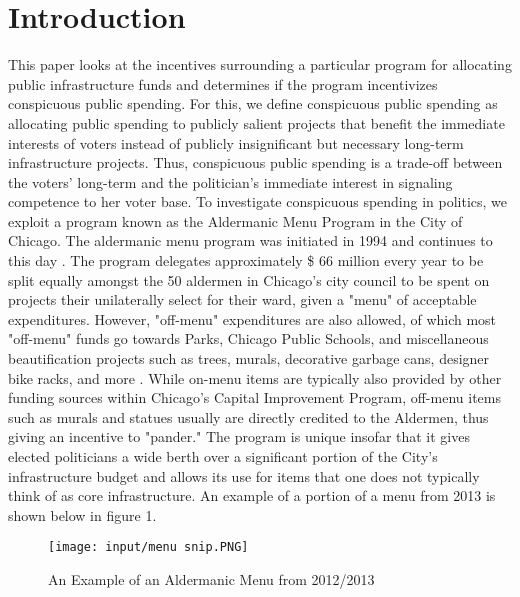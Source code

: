 \section*{Introduction}
This paper looks at the incentives surrounding a particular program for allocating public infrastructure funds and determines if the program incentivizes conspicuous public spending.
For this, we define conspicuous public spending as allocating public spending to publicly salient projects that benefit the immediate interests of voters instead of publicly insignificant but necessary long-term infrastructure projects. 
Thus, conspicuous public spending is a trade-off between the voters' long-term and the politician's immediate interest in signaling competence to her voter base. 
To investigate conspicuous spending in politics, we exploit a program known as the Aldermanic Menu Program in the City of Chicago. 
The aldermanic menu program was initiated in 1994 and continues to this day \cite{OIGaudit}. 
The program delegates approximately \$ 66 million every year to be split equally amongst the 50 aldermen in Chicago's city council to be spent on projects their unilaterally select for their ward, given a "menu" of acceptable expenditures. 
However, "off-menu" expenditures are also allowed, of which most "off-menu" funds go towards Parks, Chicago Public Schools, and miscellaneous beautification projects such as trees, murals, decorative garbage cans, designer bike racks, and more \cite{OIGaudit}. 
While on-menu items are typically also provided by other funding sources within Chicago's Capital Improvement Program, off-menu items such as murals and statues usually are directly credited to the Aldermen, thus giving an incentive to "pander."  
The program is unique insofar that it gives elected politicians a wide berth over a significant portion of the City's infrastructure budget and allows its use for items that one does not typically think of as core infrastructure. 
An example of a portion of a menu from 2013 is shown below in figure 1.


\begin{figure}[H]
    \centering
    \caption{An Example of an Aldermanic Menu from 2012/2013}
    \texttt{[image: input/menu snip.PNG]}
\end{figure}

